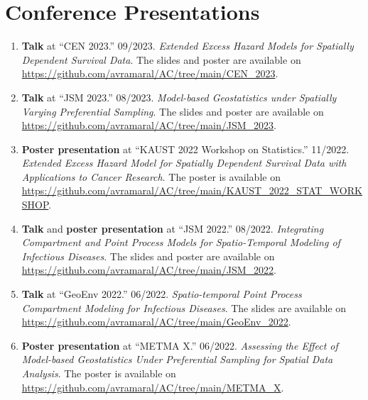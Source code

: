 \documentclass[10pt, ]{article}
\begin{document}
	\noindent\makebox[\linewidth]{\rule{\paperwidth}{0.5pt}}
	
	\vspace{-12pt}
	\section*{Conference Presentations} \vspace{-5pt}
	
	\begin{enumerate}[noitemsep, topsep=0pt]
		\item \textbf{Talk} at ``CEN 2023.'' 09/2023. \textit{Extended Excess Hazard Models for Spatially Dependent Survival Data}. The slides and poster are available on \href{https://github.com/avramaral/AC/tree/main/CEN\_2023}{\url{https://github.com/avramaral/AC/tree/main/CEN\_2023}}.
		
		\item \textbf{Talk} at ``JSM 2023.'' 08/2023. \textit{Model-based Geostatistics under Spatially Varying Preferential Sampling}. The slides and poster are available on \href{https://github.com/avramaral/AC/tree/main/JSM\_2023}{\url{https://github.com/avramaral/AC/tree/main/JSM\_2023}}.
		
		\item \textbf{Poster presentation} at ``KAUST 2022 Workshop on Statistics.'' 11/2022. \textit{Extended Excess Hazard Model for Spatially Dependent Survival Data with Applications to Cancer Research}. The poster is available on \href{https://github.com/avramaral/AC/tree/main/KAUST_2022_STAT_WORKSHOP}{\url{https://github.com/avramaral/AC/tree/main/KAUST_2022_STAT_WORKSHOP}}.
		
		\item \textbf{Talk} and \textbf{poster presentation} at ``JSM 2022.'' 08/2022. \textit{Integrating Compartment and Point Process Models for Spatio-Temporal Modeling of Infectious Diseases}. The slides and poster are available on \href{https://github.com/avramaral/AC/tree/main/JSM\_2022}{\url{https://github.com/avramaral/AC/tree/main/JSM\_2022}}.
		
		\item \textbf{Talk} at ``GeoEnv 2022.'' 06/2022. \textit{Spatio-temporal Point Process Compartment Modeling for Infectious Diseases}. The slides are available on \href{https://github.com/avramaral/AC/tree/main/GeoEnv\_2022}{\url{https://github.com/avramaral/AC/tree/main/GeoEnv\_2022}}.
		
		\item \textbf{Poster presentation} at ``METMA X.'' 06/2022. \textit{Assessing the Effect of Model-based Geostatistics Under Preferential Sampling for Spatial Data Analysis}. The poster is available on \href{https://github.com/avramaral/AC/tree/main/METMA\_X}{\url{https://github.com/avramaral/AC/tree/main/METMA\_X}}.
		

\end{enumerate}
\end{document}
